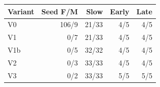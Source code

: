 \begin{tabular}{@{}lrrrr@{}}\toprule
Variant & Seed F/M & Slow & Early & Late\\\midrule
V0 & 106/9 & 21/33 & 4/5 & 4/5\\
V1 & 0/7 & 21/33 & 4/5 & 4/5\\
V1b & 0/5 & 32/32 & 4/5 & 4/5\\
V2 & 0/3 & 33/33 & 4/5 & 4/5\\
V3 & 0/2 & 33/33 & 5/5 & 5/5\\
\bottomrule\end{tabular}
